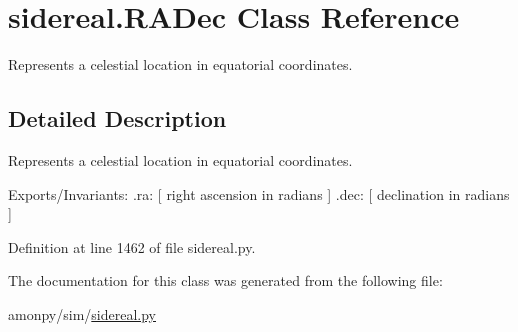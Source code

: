 \hypertarget{classsidereal_1_1_r_a_dec}{\section{sidereal.\-R\-A\-Dec Class Reference}
\label{classsidereal_1_1_r_a_dec}
}


Represents a celestial location in equatorial coordinates.  




\subsection{Detailed Description}
Represents a celestial location in equatorial coordinates. 

Exports/\-Invariants\-: .ra\-: \mbox{[} right ascension in radians \mbox{]} .dec\-: \mbox{[} declination in radians \mbox{]} 

Definition at line 1462 of file sidereal.\-py.



The documentation for this class was generated from the following file\-:\begin{DoxyCompactItemize}
\item 
amonpy/sim/\hyperlink{sidereal_8py}{sidereal.\-py}\end{DoxyCompactItemize}
